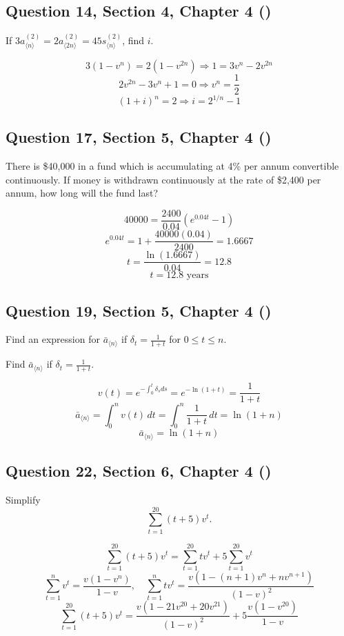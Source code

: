 \documentclass[12pt, a4paper]{article}
\newcommand{\angl}[1]{\langle #1 \rangle}
\begin{document}
\subsection*{Question 14, Section 4, Chapter 4  (\cite{toi3rd})}

\noindent If \( 3 a_{\angl{n}}^{(2)} = 2 a_{\angl{2n}}^{(2)} = 45 s_{\angl{n}}^{(2)} \), find \( i \).

\[
3(1 - v^n) = 2(1 - v^{2n}) \Rightarrow 1 = 3v^n - 2v^{2n}
\]
\[
2v^{2n} - 3v^n + 1 = 0 \Rightarrow v^n = \frac{1}{2}
\]
\[
(1 + i)^n = 2 \Rightarrow \boxed{i = 2^{1/n} - 1}
\]


\subsection*{Question 17, Section 5, Chapter 4  (\cite{toi3rd})}

\noindent There is \$40{,}000 in a fund which is accumulating at 4\% per annum convertible continuously. If money is withdrawn continuously at the rate of \$2{,}400 per annum, how long will the fund last?

\[
40000 = \frac{2400}{0.04}(e^{0.04t} - 1)
\]
\[
e^{0.04t} = 1 + \frac{40000(0.04)}{2400} = 1.6667
\]
\[
t = \frac{\ln(1.6667)}{0.04} = 12.8
\]
\[
\boxed{t = 12.8 \text{ years}}
\]

\subsection*{Question 19, Section 5, Chapter 4  (\cite{toi3rd})}

\noindent Find an expression for \( \bar{a}_{\angl{n}} \) if \( \delta_t = \frac{1}{1 + t} \) for \( 0 \le t \le n. \)

Find \( \bar{a}_{\angl{n}} \) if \( \delta_t = \frac{1}{1 + t} \).

\[
v(t) = e^{-\int_0^t \delta_s ds} = e^{-\ln(1 + t)} = \frac{1}{1 + t}
\]
\[
\bar{a}_{\angl{n}} = \int_0^n v(t)\,dt = \int_0^n \frac{1}{1 + t}\,dt = \ln(1 + n)
\]
\[
\boxed{\bar{a}_{\angl{n}} = \ln(1 + n)}
\]

\subsection*{Question 22, Section 6, Chapter 4  (\cite{toi3rd})}

\noindent Simplify
\[
\sum_{t=1}^{20} (t + 5)v^t.
\]

\[
\sum_{t=1}^{20} (t + 5)v^t = \sum_{t=1}^{20} t v^t + 5 \sum_{t=1}^{20} v^t
\]
\[
\sum_{t=1}^{n} v^t = \frac{v(1 - v^n)}{1 - v}, \quad
\sum_{t=1}^{n} t v^t = \frac{v(1 - (n+1)v^n + n v^{n+1})}{(1 - v)^2}
\]
\[
\boxed{\sum_{t=1}^{20} (t + 5)v^t =
\frac{v(1 - 21v^{20} + 20v^{21})}{(1 - v)^2}
+ 5\frac{v(1 - v^{20})}{1 - v}}
\]
\end{document}
